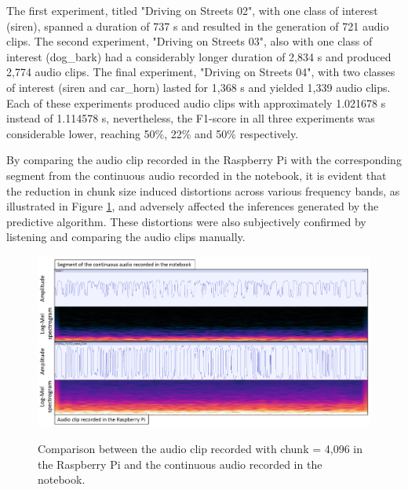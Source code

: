 The first experiment, titled "Driving on Streets 02", with one class of interest (siren), spanned a duration of 737 \gls{s} and resulted in the generation of 721 audio clips. The second experiment, "Driving on Streets 03", also with one class of interest (dog\_bark) had a considerably longer duration of 2,834 \gls{s} and produced 2,774 audio clips. The final experiment, "Driving on Streets 04", with two classes of interest (siren and car\_horn) lasted for 1,368 \gls{s} and yielded 1,339 audio clips. Each of these experiments produced audio clips with approximately 1.021678 \gls{s} instead of 1.114578 \gls{s}, nevertheless, the F1-score in all three experiments was considerable lower, reaching 50\%, 22\% and 50\% respectively.

By comparing the audio clip recorded in the Raspberry Pi with the corresponding segment from the continuous audio recorded in the notebook, it is evident that the reduction in chunk size induced distortions across various frequency bands, as illustrated in Figure \ref{fig:Results_evaluation_driving_streets_02_04}, and adversely affected the inferences generated by the predictive algorithm. These distortions were also subjectively confirmed by listening and comparing the audio clips manually.

\begin{figure}[htbp]
    \raggedright
        \caption{Comparison between the audio clip recorded with chunk = 4,096 in the Raspberry Pi and the continuous audio recorded in the notebook.}
        \includegraphics[width=1\textwidth]{resources/images/060-results/Results_evaluation_driving_streets_02_04.png}
        \label{fig:Results_evaluation_driving_streets_02_04}
\end{figure}

